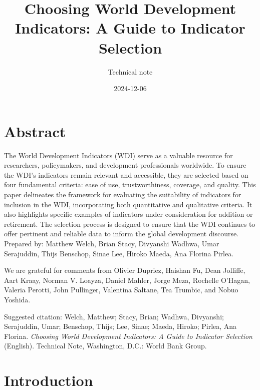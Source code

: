 \documentclass[
  11pt,
  a4paper,
  DIV=11,
  numbers=noendperiod]{scrreprt}
\title{Choosing World Development Indicators: A Guide to Indicator
Selection}
\subtitle{Technical note}
\author{}
\date{2024-12-06}
\renewcommand*\contentsname{Table of contents}
\newcommand\contentsname{Table of contents}
\begin{document}
\maketitle

\renewcommand*\contentsname{Table of contents}
{
\hypersetup{linkcolor=}
\setcounter{tocdepth}{2}
\tableofcontents
}


\chapter*{Abstract}\label{abstract}


The World Development Indicators (WDI) serve as a valuable resource for
researchers, policymakers, and development professionals worldwide. To
ensure the WDI's indicators remain relevant and accessible, they are
selected based on four fundamental criteria: ease of use,
trustworthiness, coverage, and quality. This paper delineates the
framework for evaluating the suitability of indicators for inclusion in
the WDI, incorporating both quantitative and qualitative criteria. It
also highlights specific examples of indicators under consideration for
addition or retirement. The selection process is designed to ensure that
the WDI continues to offer pertinent and reliable data to inform the
global development discourse. Prepared by: Matthew Welch, Brian Stacy,
Divyanshi Wadhwa, Umar Serajuddin, Thijs Benschop, Sinae Lee, Hiroko
Maeda, Ana Florina Pirlea.

We are grateful for comments from Olivier Dupriez, Haishan Fu, Dean
Jolliffe, Aart Kraay, Norman V. Loayza, Daniel Mahler, Jorge Meza,
Rochelle O'Hagan, Valeria Perotti, John Pullinger, Valentina Saltane,
Tea Trumbic, and Nobuo Yoshida.

Suggested citation: Welch, Matthew; Stacy, Brian; Wadhwa, Divyanshi;
Serajuddin, Umar; Benschop, Thijs; Lee, Sinae; Maeda, Hiroko; Pirlea,
Ana Florina. \emph{Choosing World Development Indicators: A Guide to
Indicator Selection} (English). Technical Note, Washington, D.C.: World
Bank Group.


\chapter{Introduction}\label{introduction}
\end{document}
